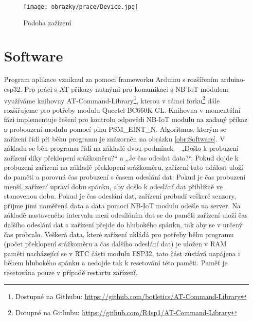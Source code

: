     
    \begin{figure}[!h]
      \begin{center}
        \texttt{[image: obrazky/prace/Device.jpg]}
      \end{center}
      \caption[Podoba zařízení]{Podoba zažízení}
      \label{obr:Device}
    \end{figure}
    




\chapter{Software}
\par Program aplikace vzniknul za pomoci frameworku Arduinu s rozšířením arduino-esp32. Pro práci s AT příkazy nutnými pro komunikaci s NB-IoT modulem využíváme knihovny AT-Command-Library\footnote{Dostupné na Githubu: \url{https://github.com/botletics/AT-Command-Library}}, kterou v rámci forku\footnote{Dotupné na Githubu: \url{https://github.com/R4sp1/AT-Command-Library}} dále rozšiřujeme pro potřeby modulu Quectel BC660K-GL. Knihovna v momentální fázi implementuje řešení pro kontrolu odpovědi NB-IoT modulu na zadaný příkaz a probouzení modulu pomocí pinu PSM\_EINT\_N. Algoritmus, kterým se zařízení řídí při běhu programu je znázorněn na obrázku \ref{obr:Software}. V základu se běh programu řídí na základě dvou podmínek – „Došlo k probuzení zařízení díky překlopení srážkoměru?“ a „Je čas odeslat data?“. Pokud dojde k probuzení zařízení na základě překlopení srážkoměru, zařízení tuto událost uloží do paměti a porovná čas probuzení s časem odeslání dat. Pokud je čas probuzení menší, zařízení upraví dobu spánku, aby došlo k odeslání dat přibližně ve stanovenou dobu. Pokud je čas odeslání dat, zařízení probudí veškeré senzory, přijme jimi naměřená data a data pomocí NB-IoT modulu odešle na server. Na základě nastaveného intervalu mezi odesíláním dat se do paměti zařízení uloží čas dalšího odeslání dat a zařízení přejde do hlubokého spánku, tak aby se v určený čas probralo. Veškerá data, které zařízení ukládá pro potřeby běhu programu (počet překlopení srážkoměru a čas dalšího odeslání dat) je uložen v RAM paměti nacházející se v RTC části modulu ESP32, tato část zůstává napájena i během hlubokého spánku a nedojde tak k resetování této paměti. Paměť je resetována pouze v případě restartu zařízení.

